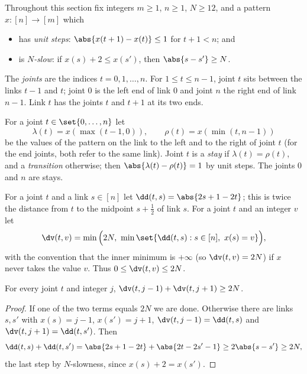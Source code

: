 Throughout this section fix integers $m\ge1$, $n\ge1$, $N\ge12$, and a pattern $x\colon[n]\to[m]$
which
\begin{itemize}
\item has \emph{unit steps}: $\abs{x(t+1)-x(t)}\le1$ for $t+1<n$; and
\item is \emph{$N$-slow}: if $x(s)+2\le x(s')$, then $\abs{s-s'}\ge N$.
\end{itemize}


The \emph{joints} are the indices $t=0,1,\dots,n$. For $1\le t\le n-1$, joint $t$ sits between the
links $t-1$ and $t$; joint $0$ is the left end of link $0$ and joint $n$ the right end of link
$n-1$. Link $t$ has the joints $t$ and $t+1$ at its two ends.

\begin{definition}\label{def:joint-values}
For a joint $t\in\set{0,\dots,n}$ let
\[
\lambda(t)=x(\max(t-1,0)),\qquad\rho(t)=x(\min(t,n-1))
\]
be the values of the pattern on the link to the left and to the right of joint $t$ (for the end
joints, both refer to the same link). Joint $t$ is a \emph{stay} if $\lambda(t)=\rho(t)$, and a
\emph{transition} otherwise; then $\abs{\lambda(t)-\rho(t)}=1$ by unit steps. The joints $0$
and $n$ are stays.
\end{definition}

For a joint $t$ and a link $s\in[n]$ let $\dd(t,s)=\abs{2s+1-2t}$; this is twice the distance from
$t$ to the midpoint $s+\frac12$ of link $s$. For a joint $t$ and an integer $v$ let
\[
\dv(t,v)=\min\Big(2N,\ \min\set{\dd(t,s): s\in[n],\ x(s)=v}\Big),
\]
with the convention that the inner minimum is $+\infty$ (so $\dv(t,v)=2N$) if $x$ never takes the
value $v$. Thus $0\le\dv(t,v)\le2N$.

\begin{lemma}\label{lem:dv-sum}
For every joint $t$ and integer $j$, $\dv(t,j-1)+\dv(t,j+1)\ge2N$.
\end{lemma}

\begin{proof}
If one of the two terms equals $2N$ we are done. Otherwise there are links $s,s'$ with
$x(s)=j-1$, $x(s')=j+1$, $\dv(t,j-1)=\dd(t,s)$ and $\dv(t,j+1)=\dd(t,s')$. Then
\[
\dd(t,s)+\dd(t,s')=\abs{2s+1-2t}+\abs{2t-2s'-1}\ge2\abs{s-s'}\ge2N,
\]
the last step by $N$-slowness, since $x(s)+2=x(s')$.
\end{proof}

